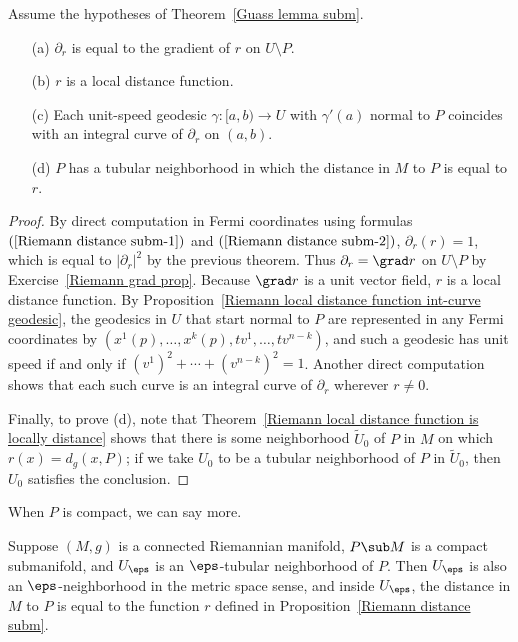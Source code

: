 \begin{corollary}\label{Riemann distance subm prop}
Assume the hypotheses of Theorem~\ref{Guass lemma subm}.
\begin{itemize}
\item[(a)] $\partial_r$ is equal to the gradient of $r$ on $U\setminus P$.
\item[(b)] $r$ is a local distance function.
\item[(c)] Each unit-speed geodesic $\gamma:[a,b)\to U$ with $\gamma'(a)$ normal to $P$ coincides with an integral curve of $\partial_r$ on $(a,b)$.
\item[(d)] $P$ has a tubular neighborhood in which the distance in $M$ to $P$ is equal to $r$.
\end{itemize}
\end{corollary}
\begin{proof}
By direct computation in Fermi coordinates using formulas $(\ref{Riemann distance subm-1})$ and $(\ref{Riemann distance subm-2})$, $\partial_r(r)=1$, which is equal to 
$|\partial_r|^2$ by the previous theorem. Thus $\partial_r=\grad r$ on $U\setminus P$ by Exercise~\ref{Riemann grad prop}. Because $\grad r$ is a unit vector field, $r$ is a local distance function. By Proposition~\ref{Riemann local distance function int-curve geodesic}, the geodesics in $U$ that start normal to $P$ are represented in any Fermi coordinates by $(x^1(p),\dots,x^k(p),tv^1,\dots,tv^{n-k})$, and such a geodesic has unit speed if and only if $(v^1)^2+\cdots+(v^{n-k})^2=1$. Another direct computation shows that each such curve is an integral curve of $\partial_r$ wherever $r\neq 0$.\par
Finally, to prove (d), note that Theorem~\ref{Riemann local distance function is locally distance} shows that there is some neighborhood $\widetilde{U}_0$ of $P$ in $M$ on which  $r(x)=d_g(x,P)$; if we take $U_0$ to be a tubular neighborhood of $P$ in $\widetilde{U}_0$, then $U_0$ satisfies the conclusion.
\end{proof}
When $P$ is compact, we can say more.
\begin{theorem}
Suppose $(M,g)$ is a connected Riemannian manifold, $P\sub M$ is a compact submanifold, and $U_\eps$ is an $\eps$-tubular neighborhood of $P$. Then $U_\eps$ is also an 
$\eps$-neighborhood in the metric space sense, and inside $U_\eps$, the distance in $M$ to $P$ is equal to the function $r$ defined in Proposition~\ref{Riemann distance subm}.
\end{theorem}
